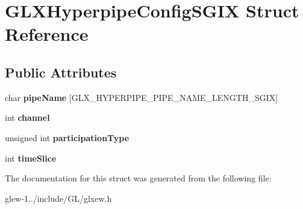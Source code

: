 \hypertarget{struct_g_l_x_hyperpipe_config_s_g_i_x}{\section{G\-L\-X\-Hyperpipe\-Config\-S\-G\-I\-X Struct Reference}
\label{struct_g_l_x_hyperpipe_config_s_g_i_x}
}
\subsection*{Public Attributes}
\begin{DoxyCompactItemize}
\item 
\hypertarget{struct_g_l_x_hyperpipe_config_s_g_i_x_a9e3748f92005cac81cb44d4c67acccb8}{char {\bfseries pipe\-Name} \mbox{[}G\-L\-X\-\_\-\-H\-Y\-P\-E\-R\-P\-I\-P\-E\-\_\-\-P\-I\-P\-E\-\_\-\-N\-A\-M\-E\-\_\-\-L\-E\-N\-G\-T\-H\-\_\-\-S\-G\-I\-X\mbox{]}}\label{struct_g_l_x_hyperpipe_config_s_g_i_x_a9e3748f92005cac81cb44d4c67acccb8}

\item 
\hypertarget{struct_g_l_x_hyperpipe_config_s_g_i_x_abc812d8796ba89d5de4e33b3532d8335}{int {\bfseries channel}}\label{struct_g_l_x_hyperpipe_config_s_g_i_x_abc812d8796ba89d5de4e33b3532d8335}

\item 
\hypertarget{struct_g_l_x_hyperpipe_config_s_g_i_x_a093cfaaec305531f66e1120929b5b01b}{unsigned int {\bfseries participation\-Type}}\label{struct_g_l_x_hyperpipe_config_s_g_i_x_a093cfaaec305531f66e1120929b5b01b}

\item 
\hypertarget{struct_g_l_x_hyperpipe_config_s_g_i_x_afe9288e75dc1ae5e0f33eff978d7024d}{int {\bfseries time\-Slice}}\label{struct_g_l_x_hyperpipe_config_s_g_i_x_afe9288e75dc1ae5e0f33eff978d7024d}

\end{DoxyCompactItemize}


The documentation for this struct was generated from the following file\-:\begin{DoxyCompactItemize}
\item 
glew-\/1../include/\-G\-L/glxew.\-h\end{DoxyCompactItemize}
